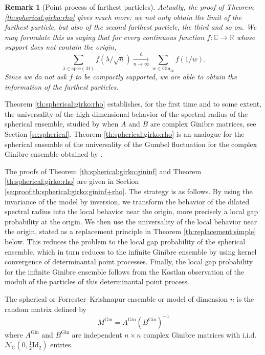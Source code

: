 \documentclass[10pt,reqno]{amsart}
\newcommand{\<}{\langle}
\renewcommand{\>}{\rangle}
\newcommand{\AG}{A^{\mathrm{Gin}}}
\newcommand{\BG}{B^{\mathrm{Gin}}}
\newcommand{\MG}{M^{\mathrm{Gin}}}
\numberwithin{equation}{section}
\newtheorem{remark}[theorem]{Remark}%
\begin{document}
\begin{remark}[Point process of farthest particles]
Actually, the proof of Theorem 
\ref{th:spherical:girko:rho} gives much more: we not
only obtain the limit of the farthest particle,
but also of the second farthest particle, 
the third and so on.
We may formulate this as saying that for every
continuous function $f:\mathbb C \to \mathbb R$
whose support does not contain the origin,
\[\sum_{\lambda \in \mathrm{spec}(M)}
f(\lambda/\sqrt n) \xrightarrow[n \to \infty]
{\mathrm d} \sum_{w \in \mathrm{Gin}_\infty} f(1/w).\]
Since we do not ask $f$ to be compactly supported,
we are able to obtain the information
of the farthest particles.
\end{remark}


Theorem \ref{th:spherical:girko:rho} establishes, for the first time and to some extent, the universality of the high-dimensional behavior of the spectral radius of the spherical ensemble, studied by \cite{MR3615091} when $A$ and $B$ are complex Ginibre matrices, see Section \ref{se:spherical}. Theorem \ref{th:spherical:girko:rho} is an analogue for the spherical ensemble of the universality of the Gumbel fluctuation for the complex Ginibre ensemble obtained by \cite{cipolloni2024universalityextremaleigenvalueslarge}. 

The proofs of Theorem \ref{th:spherical:girko:gininf} and Theorem \ref{th:spherical:girko:rho} are given in Section \ref{se:proof:th:spherical:girko:gininf+rho}. The strategy is as follows. By using the invariance of the model by inversion, we transform the behavior of the dilated spectral radius into the local behavior near the origin, more precisely a local gap probability at the origin. We then use the universality of the local behavior near the origin, stated as a replacement principle in Theorem \ref{th:replacement:simple} below. This reduces the problem to the local gap probability of the spherical ensemble, which in turn reduces to the infinite Ginibre ensemble by using kernel convergence of determinantal point processes. Finally, the local gap probability for the infinite Ginibre ensemble follows from the Kostlan observation of the moduli of the particles of this determinantal point process.

The spherical or Forrester--Krishnapur ensemble or model of dimension $n$ is the random matrix defined by
\begin{equation}\label{eq:spherical}
    \MG=\AG (\BG)^{-1}
\end{equation}
where $\AG$ and $\BG$ are independent $n\times n$ complex Ginibre matrices with i.i.d.\ $\mathcal{N}_{\mathbb{C}}(0,\frac{1}{2}\mathrm{Id}_2)$ entries.
\end{document}
